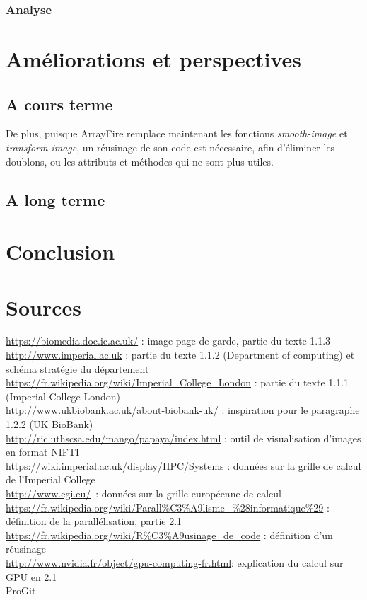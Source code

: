 \documentclass[10pt]{report}
\begin{document}
	\subsection{Analyse}
	
\chapter{Améliorations et perspectives}
	\section{A cours terme}
		De plus, puisque ArrayFire remplace maintenant les fonctions \textit{smooth-image} et \textit{transform-image}, un réusinage de son code est nécessaire, afin d'éliminer les doublons, ou les attributs et méthodes qui ne sont plus utiles.
	\section{A long terme}
\chapter*{Conclusion} %
\chapter*{Sources}
\noindent
\url{https://biomedia.doc.ic.ac.uk/}  : image page de garde, partie du texte 1.1.3 \\
\url{http://www.imperial.ac.uk} : partie du texte 1.1.2 (Department of computing) et schéma stratégie du département\\
\url{https://fr.wikipedia.org/wiki/Imperial_College_London} : partie du texte 1.1.1 (Imperial College London)\\
\url{http://www.ukbiobank.ac.uk/about-biobank-uk/} : inspiration pour le paragraphe 1.2.2 (UK BioBank)\\
\url{http://ric.uthscsa.edu/mango/papaya/index.html} : outil de visualisation d'images en format NIFTI\\
\url{https://wiki.imperial.ac.uk/display/HPC/Systems} : données sur la grille de calcul de l'Imperial College\\
\url{http://www.egi.eu/} : données sur la grille européenne de calcul
\url{https://fr.wikipedia.org/wiki/Parall\%C3\%A9lisme_\%28informatique\%29} : définition de la parallélisation, partie 2.1\\
\url{https://fr.wikipedia.org/wiki/R\%C3\%A9usinage_de_code} :  définition d'un réusinage \\
\url{http://www.nvidia.fr/object/gpu-computing-fr.html}: explication du calcul sur GPU en 2.1\\
ProGit\\
\end{document}
